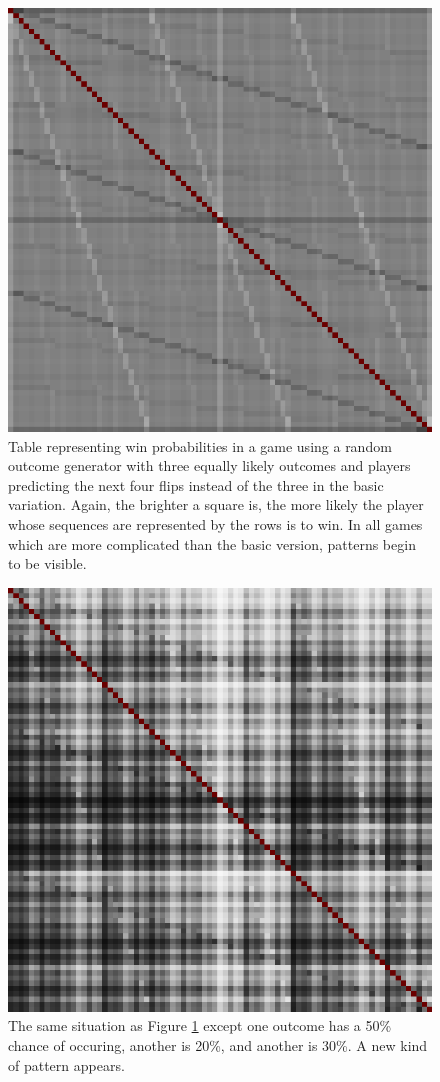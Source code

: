 \documentclass[english,12pt,a4paper,final]{article}
\begin{document}
\begin{figure} [H]
	\centering
	\includegraphics[width=0.7\linewidth]{s3k4}
	\caption{Table representing win probabilities in a game using a random outcome generator with three equally likely outcomes and players predicting the next four flips instead of the three in the basic variation. Again, the brighter a square is, the more likely the player whose sequences are represented by the rows is to win. In all games which are more complicated than the basic version, patterns begin to be visible.}
	\label{fig:s3k4}
\end{figure}

\begin{figure} [H]
	\centering
	\includegraphics[width=0.7\linewidth]{"s3k4 uneven"}
	\caption{The same situation as Figure \ref{fig:s3k4} except one outcome has a 50\% chance of occuring, another is 20\%, and another is 30\%. A new kind of pattern appears.}
	\label{fig:s3k4-uneven}
\end{figure}
\end{document}
